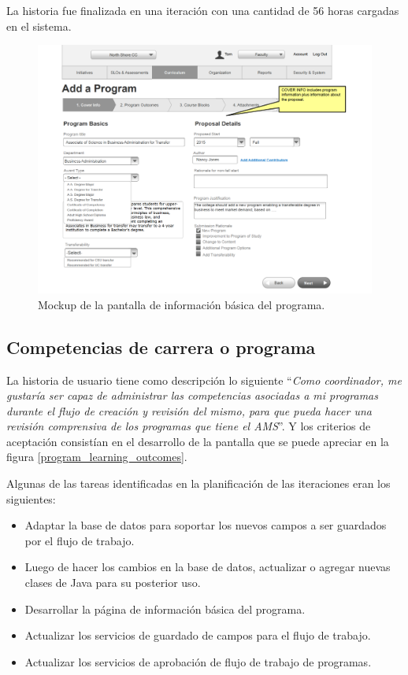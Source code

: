 La historia fue finalizada en una iteración con una cantidad de 56 horas cargadas en el sistema.

\begin{figure}[H]
\centering
\includegraphics[width=125mm,scale=1]{Capitulos/DesarrollodelaAplicacion/Imagenes/program_cover_info}
\caption{Mockup de la pantalla de información básica del programa.}
  \label{program_cover_info}
\end{figure}

\subsection{Competencias de carrera o programa}
La historia de usuario tiene como descripción lo siguiente \enquote{\textit{Como coordinador, me gustaría ser capaz de administrar las competencias asociadas a mi programas durante el flujo de creación y revisión del mismo, para que pueda hacer una revisión comprensiva de los programas que tiene el AMS}}. Y los criterios de aceptación consistían en el desarrollo de la pantalla que se puede apreciar en la figura \ref{program_learning_outcomes}.

Algunas de las tareas identificadas en la planificación de las iteraciones eran los siguientes:
\begin{itemize}
	\item Adaptar la base de datos para soportar los nuevos campos a ser guardados por el flujo de trabajo.
	\item Luego de hacer los cambios en la base de datos, actualizar o agregar nuevas clases de Java para su posterior uso.
	\item Desarrollar la página de información básica del programa.
	\item Actualizar los servicios de guardado de campos para el flujo de trabajo.
	\item Actualizar los servicios de aprobación de flujo de trabajo de programas.
\end{itemize}


